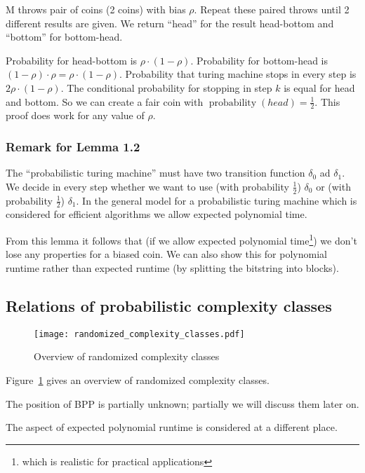 \documentclass[a4paper]{article}
\newcommand{\cls}[1]{\rm{#1}}
\DeclareMathOperator{\prop}{probability}
\begin{document}
M throws pair of coins (2 coins) with bias $\rho$. Repeat these paired throws
until 2 different results are given. We return ``head'' for the result
head-bottom and ``bottom'' for bottom-head.

Probability for head-bottom is $\rho \cdot (1-\rho)$.
Probability for bottom-head is $(1-\rho) \cdot \rho = \rho \cdot (1 - \rho)$.
Probability that turing machine stops in every step is $2\rho \cdot (1-\rho)$.
The conditional probability for stopping in step $k$ is equal for head
and bottom. So we can create a fair coin with $\prop(head) = \frac12$.
This proof does work for any value of $\rho$.

\subsubsection{Remark for Lemma 1.2}
%
The ``probabilistic turing machine'' must have two transition function
$\delta_0$ ad $\delta_1$. We decide in every step whether we want to use
(with probability $\frac12$) $\delta_0$ or (with probability $\frac12$)
$\delta_1$. In the general model for a probabilistic turing machine
which is considered for efficient algorithms we allow expected polynomial
time.

From this lemma it follows that (if we allow expected polynomial
time\footnote{which is realistic for practical applications})
we don't lose any properties for a biased coin.
We can also show this for polynomial runtime rather than expected runtime
(by splitting the bitstring into blocks).

\subsection{Relations of probabilistic complexity classes}
%
\begin{figure}[ht]
  \begin{center}
    \texttt{[image: randomized\_complexity\_classes.pdf]}
    \caption{Overview of randomized complexity classes}
    \label{fig:complexity-classes}
  \end{center}
\end{figure}

Figure~\ref{fig:complexity-classes} gives an overview of randomized complexity classes.

The position of \cls{BPP} is partially unknown; partially we will discuss them later on.

The aspect of expected polynomial runtime is considered at a different place.
\end{document}
